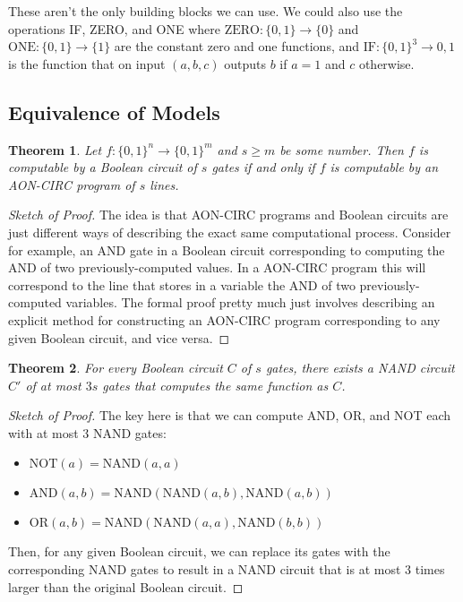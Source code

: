 \documentclass[11pt]{article}
\newtheorem{theorem}{Theorem}
\theoremstyle{definition}
\theoremstyle{remark}
\begin{document}
These aren't the only building blocks we can use. We could also use the operations IF, ZERO, and ONE where $\text{ZERO}:\{0,1\} \rightarrow \{0\}$ and $\text{ONE}:\{0,1\} \rightarrow \{1\}$ are the constant zero and one functions, and $\text{IF}:\{0,1\}^3 \rightarrow {0,1}$ is the function that on input $(a,b,c)$ outputs $b$ if $a=1$ and $c$ otherwise.

\subsection{Equivalence of Models}

\begin{theorem}
Let $f:\{0,1\}^n \rightarrow \{0,1\}^m$ and $s \geq m$ be some number. Then $f$ is computable by a Boolean circuit of $s$ gates if and only if $f$ is computable by an AON-CIRC program of $s$ lines.
\end{theorem}
\begin{proof}[Sketch of Proof]
The idea is that AON-CIRC programs and Boolean circuits
are just different ways of describing the exact same computational process. Consider for example, an AND gate in a Boolean circuit corresponding to computing the AND of two previously-computed values. In a AON-CIRC program this will correspond to the line that stores in a variable
the AND of two previously-computed variables. The formal proof pretty much just involves describing an explicit method for constructing an AON-CIRC program corresponding to any given Boolean circuit, and vice versa.
\end{proof}

\begin{theorem}
For every Boolean circuit $C$ of $s$ gates, there exists a NAND circuit $C'$ of at most $3s$ gates that computes the same function as $C$.
\end{theorem}
\begin{proof}[Sketch of Proof]
The key here is that we can compute AND, OR, and NOT each with at most $3$ NAND gates:
\begin{itemize}
\item $\text{NOT}(a) = \text{NAND}(a,a)$
\item $\text{AND}(a,b) = \text{NAND}(\text{NAND}(a,b),\text{NAND}(a,b))$
\item $\text{OR}(a,b) = \text{NAND}(\text{NAND}(a,a),\text{NAND}(b,b))$
\end{itemize}
Then, for any given Boolean circuit, we can replace its gates with the corresponding NAND gates to result in a NAND circuit that is at most $3$ times larger than the original Boolean circuit.
\end{proof}
\end{document}
